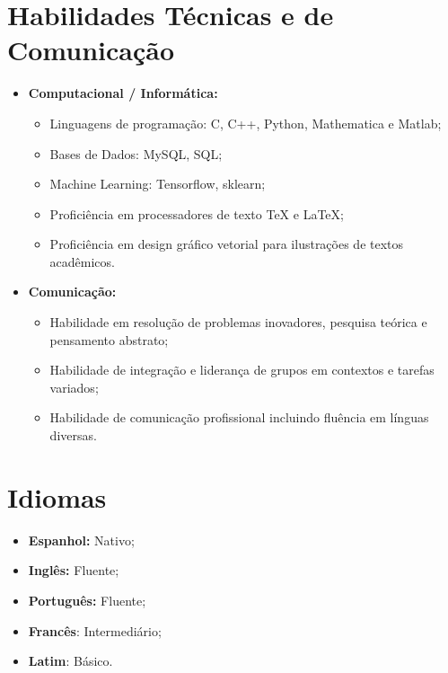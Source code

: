 \documentclass[11pt,a4paper,sans]{moderncv}        %
\begin{document}
\section{Habilidades Técnicas e de Comunicação}

\vspace{4pt}

\begin{itemize}

\item \textbf{Computacional / Informática:} 
\begin{itemize}
\item Linguagens de programação: C, C++, Python, Mathematica e Matlab;
\item Bases de Dados: MySQL, SQL;
\item Machine Learning: Tensorflow, sklearn; 
\item Proficiência em processadores de texto TeX e LaTeX;
\item Proficiência em design gráfico vetorial para ilustrações de textos acadêmicos. 
\end{itemize}

\item \textbf{Comunicação:} 

\begin{itemize}
\item Habilidade em resolução de problemas inovadores, pesquisa teórica e pensamento abstrato;
\vspace{1pt}
\item Habilidade de integração e liderança de grupos em contextos e tarefas variados; 
\vspace{1pt}
\item Habilidade de comunicação profissional incluindo fluência em línguas diversas.

\end{itemize}

\end{itemize}

\section{Idiomas}
\vspace{4pt}
\begin{itemize}
\item{\textbf{Espanhol:}} Nativo;
\item{\textbf{Inglês:}} Fluente;
\item{\textbf{Português:}} Fluente;
\item{\textbf{Francês}:} Intermediário;
\item{\textbf{Latim}:} Básico.
\end{itemize}
\end{document}
